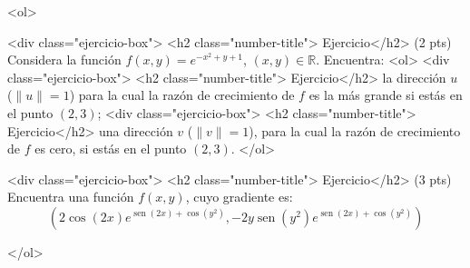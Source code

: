 \documentclass[12pt]{article}
\newcommand{\sen}{\operatorname{sen}}
\begin{document}
\bigskip

            
\bigskip
\bigskip
\bigskip


<ol>

  
<div class="ejercicio-box"> <h2 class="number-title"> Ejercicio</h2> (2 pts) Considera la función
  $f(x,y)=e^{-x^2+y+1}$, $(x,y)\in \mathbb{R}$. Encuentra:
  <ol>
    <div class="ejercicio-box"> <h2 class="number-title"> Ejercicio</h2> la dirección $u$ ($\|u\|=1$) para la cual
      la razón de crecimiento de $f$ es la más grande si estás
      en el punto $(2,3)$;
     <div class="ejercicio-box"> <h2 class="number-title"> Ejercicio</h2> una dirección $v$ ($\|v\|=1$), para la cual
       la razón de crecimiento de $f$ es cero, si estás en el punto
       $(2,3)$.
</ol>


  
\vspace{4cm}  


<div class="ejercicio-box"> <h2 class="number-title"> Ejercicio</h2> (3 pts) Encuentra una función $f(x,y)$, cuyo gradiente es:
  $$(2\cos(2x)e^{\sen(2x)+\cos(y^2)},-2y\sen(y^2)e^{\sen(2x)+\cos(y^2)})$$

</ol>


  
\end{document}
